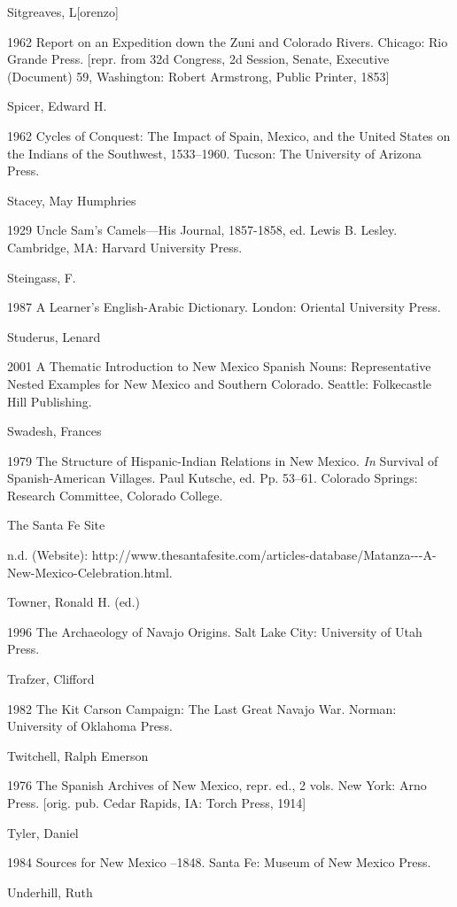 Sitgreaves, L[orenzo]

1962  Report on an Expedition down the Zuni and Colorado Rivers.  Chicago:  Rio Grande Press.  [repr. from 32d Congress, 2d Session, Senate, Executive (Document) 59, Washington:  Robert Armstrong, Public Printer, 1853]

Spicer, Edward H.  

1962  Cycles of Conquest:  The Impact of Spain, Mexico, and the United States on the Indians of the Southwest, 1533–1960.  Tucson:  The University of Arizona Press.

Stacey, May Humphries

1929  Uncle Sam’s Camels—His Journal, 1857-1858, ed. Lewis B. Lesley.  Cambridge, MA:  Harvard University Press.

Steingass, F.  

1987  A Learner’s English-Arabic Dictionary.  London:  Oriental University Press.

Studerus, Lenard

2001  A Thematic Introduction to New Mexico Spanish Nouns: Representative Nested Examples for New Mexico and Southern Colorado.  Seattle:  Folkecastle Hill Publishing.

Swadesh, Frances

1979  The Structure of Hispanic-Indian Relations in New Mexico.  \textit{In} Survival of Spanish-American Villages.  Paul Kutsche, ed.  Pp. 53–61.  Colorado Springs:  Research Committee, Colorado College.

The Santa Fe Site  

n.d.  (Website): http://www.thesantafesite.com/articles-database/Matanza-{}-{}-A-New-Mexico-Celebration.html.

Towner, Ronald H. (ed.)

1996  The Archaeology of Navajo Origins.  Salt Lake City:  University of Utah Press.

Trafzer, Clifford

1982  The Kit Carson Campaign: The Last Great Navajo War.  Norman:  University of Oklahoma Press.

Twitchell, Ralph Emerson

1976  The Spanish Archives of New Mexico, repr. ed., 2 vols.  New York:  Arno Press.  [orig. pub. Cedar Rapids, IA:  Torch Press, 1914]

Tyler, Daniel

1984  Sources for New Mexico \citealt{History1821}–1848.  Santa Fe:  Museum of New Mexico Press.

Underhill, Ruth


